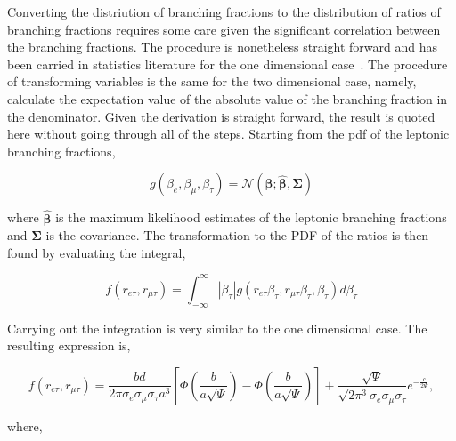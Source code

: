 

Converting the distriution of branching fractions to the distribution of
ratios of branching fractions requires some care given the significant
correlation between the branching fractions.  The procedure is
nonetheless straight forward and has been carried in statistics
literature for the one dimensional case~\cite{10.1093/biomet/24.3-4.428,
10.2307/2334671}.  The procedure of transforming variables is the same
for the two dimensional case, namely, calculate the expectation value of
the absolute value of the branching fraction in the denominator.  Given
the derivation is straight forward, the result is quoted here without
going through all of the steps.  Starting from the pdf of the leptonic
branching fractions,

\begin{equation}
    g(\beta_{e}, \beta_{\mu}, \beta_{\tau}) =
    \mathcal{N}\left(\boldsymbol{\beta}; \hat{\boldsymbol{\beta}}, \boldsymbol{\Sigma}\right)
\end{equation}

\noindent where $\hat{\boldsymbol{\beta}}$ is the maximum likelihood estimates of the
leptonic branching fractions and $\boldsymbol{\Sigma}$ is the covariance.
The transformation to the PDF of the ratios is then found by evaluating
the integral,




\begin{equation}
    f(r_{e\tau}, r_{\mu\tau}) = \int_{-\infty}^{\infty}
    \left| \beta_{\tau}\right|g(r_{e\tau}\beta_{\tau}, r_{\mu\tau}\beta_{\tau}, \beta_{\tau})
    d\beta_{\tau}
\end{equation}

\noindent Carrying out the integration is very similar to the one dimensional
case.  The resulting expression is,

\begin{equation}
    f(r_{e\tau}, r_{\mu\tau}) 
    = \frac{bd}{2\pi \sigma_{e}\sigma_{\mu}\sigma_{\tau} a^{3}}
        \left[ \Phi \left(\frac{b}{a\sqrt{\Psi}}\right)
         - \Phi\left(\frac{b}{a\sqrt{\Psi}}\right)\right] 
         +
         \frac{\sqrt{\Psi}}{\sqrt{2\pi^{3}}\sigma_{e}\sigma_{\mu}\sigma_{\tau}}e^{-\frac{c}{2\Psi}},
\end{equation}

\noindent where,

